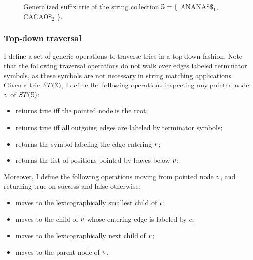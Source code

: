 \begin{figure}[t]
\caption[Example of generalized suffix trie]{Generalized suffix trie of the string collection $\mathbb{S} = \{$ {\ttfamily ANANAS$\$_1$}, {\ttfamily CACAO$\$_2$} $\}$.}
\label{fig:gstrie}
\begin{center}

\end{center}
\end{figure}

\subsubsection{Top-down traversal}

I define a set of generic operations to traverse tries in a top-down fashion.
Note that the following traversal operations do not walk over edges labeled terminator symbols, as these symbols are not necessary in string matching applications.
Given a trie $ST(\mathbb{S})$, I define the following operations inspecting any pointed node $v$ of $ST(\mathbb{S})$:
\begin{itemize}
\item {} returns true iff the pointed node is the root;
\item {} returns true iff all outgoing edges are labeled by terminator symbols;
\item {} returns the symbol labeling the edge entering $v$;
\item {} returns the list of positions pointed by leaves below $v$;
\end{itemize}
Moreover, I define the following operations moving from pointed node $v$, and returning true on success and false otherwise:
\begin{itemize}
\item {} moves to the lexicographically smallest child of $v$;
\item {} moves to the child of $v$ whose entering edge is labeled by $c$;
\item {} moves to the lexicographically next child of $v$;
\item {} moves to the parent node of $v$.
\end{itemize}

